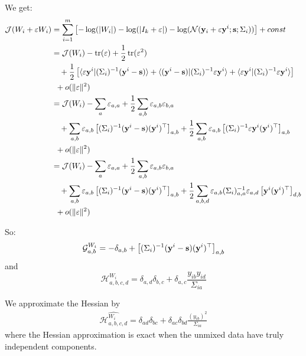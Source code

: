 \documentclass[12pt]{report}
\begin{document}
 We get:
 \begin{align}
   \mathcal{J}(W_i + \varepsilon W_i) &= \sum_{i=1}^m \left[ -\log(|W_i|) -\log(|I_k + \varepsilon|) - \log(\mathcal{N}(\mathbf{y}_i + \varepsilon \mathbf{y}^i; \mathbf{s}; \Sigma_i)) \right] + const \\
                                      &= \mathcal{J}(W_i) - \mathop{\mathrm{tr}}(\varepsilon) + \frac12 \mathop{\mathrm{tr}}(\varepsilon^2) \\& \enspace \enspace + \frac12 \left[\langle \varepsilon \mathbf{y}^i| (\Sigma_i)^{-1} (\mathbf{y}^i - \mathbf{s}) \rangle + \langle (\mathbf{y}^i - \mathbf{s})| (\Sigma_i)^{-1} \varepsilon \mathbf{y}^i \rangle + \langle \varepsilon \mathbf{y}^i| (\Sigma_i)^{-1} \varepsilon \mathbf{y}^i \rangle \right] \\ & \enspace + o(\|\varepsilon\|^2) \\
   &= \mathcal{J}(W_i) - \sum_a \varepsilon_{a, a} + \frac12 \sum_{a, b} \varepsilon_{a,b} \varepsilon_{b, a} \\& \enspace \enspace + \sum_{a, b} \varepsilon_{a, b} \left[(\Sigma_i)^{-1}(\mathbf{y}^i - \mathbf{s}) (\mathbf{y}^i)^{\top} \right]_{a, b} + \frac12 \sum_{a, b} \varepsilon_{a, b} \left[(\Sigma_i)^{-1} \varepsilon \mathbf{y}^i (\mathbf{y}^i)^{\top}\right]_{a, b} \\ & \enspace + o(\|\varepsilon\|^2) \\
   &= \mathcal{J}(W_i) - \sum_a \varepsilon_{a, a} + \frac12 \sum_{a, b} \varepsilon_{a,b} \varepsilon_{b, a} \\& \enspace \enspace + \sum_{a, b} \varepsilon_{a, b} \left[(\Sigma_i)^{-1}(\mathbf{y}^i - \mathbf{s}) (\mathbf{y}^i)^{\top} \right]_{a, b} + \frac12 \sum_{a, b, d} \varepsilon_{a, b} (\Sigma_i)^{-1}_{a, a} \varepsilon_{a, d} \left[\mathbf{y}^i (\mathbf{y}^i)^{\top}\right]_{d, b} \\ & \enspace + o(\|\varepsilon\|^2) \\
 \end{align}

 So:
 \begin{equation}
 \mathcal{G}^{W_i}_{a, b} =  -\delta_{a,b} + \left[(\Sigma_i)^{-1} (\mathbf{y}^i - \mathbf{s})(\mathbf{y}^i)^{\top}\right]_{a, b}
 \end{equation}
 and
 \begin{equation}
 \mathcal{H}^{W_i}_{a, b, c, d} = \delta_{a, d}\delta_{b, c} + \delta_{a, c} \frac{y_{ib} y_{id}}{\Sigma_{ia}}
 \end{equation}
 
 We approximate the Hessian by
 \begin{align}
 \widehat{\mathcal{H}^{W_i}_{a, b, c, d}} = \delta_{ad} \delta_{bc} + \delta_{ac} \delta_{bd}\frac{(y_{ib})^2}{\Sigma_{ia}}
\end{align}
where the Hessian approximation is exact when the unmixed data have truly independent components.
\end{document}
